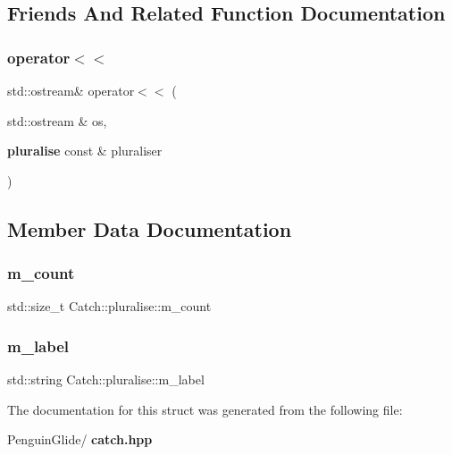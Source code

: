 \subsection{Friends And Related Function Documentation}
\mbox{\label{struct_catch_1_1pluralise_aa7dac6b165514c1f85e0695d678fdef5}} 
\subsubsection{operator$<$$<$}
{\footnotesize\ttfamily std\+::ostream\& operator$<$$<$ (\begin{DoxyParamCaption}\item[{std\+::ostream \&}]{os,  }\item[{\textbf{ pluralise} const \&}]{pluraliser }\end{DoxyParamCaption})\hspace{0.3cm}{\ttfamily [friend]}}



\subsection{Member Data Documentation}
\mbox{\label{struct_catch_1_1pluralise_a4dce2fa13ec6f00fac09b2418265441e}} 
\subsubsection{m\_count}
{\footnotesize\ttfamily std\+::size\+\_\+t Catch\+::pluralise\+::m\+\_\+count}

\mbox{\label{struct_catch_1_1pluralise_a8849cbdd3f11ebe7747597c8644e8793}} 
\subsubsection{m\_label}
{\footnotesize\ttfamily std\+::string Catch\+::pluralise\+::m\+\_\+label}



The documentation for this struct was generated from the following file\+:\begin{DoxyCompactItemize}
\item 
Penguin\+Glide/\textbf{ catch.\+hpp}\end{DoxyCompactItemize}
